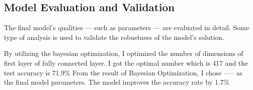 \subsection{Model Evaluation and Validation}
The final model’s qualities — such as parameters — are evaluated in detail. Some type of analysis is used to validate the robustness of the model’s solution.

By utilizing the bayesian optimization, I optimized the number of dimensions of first layer of fully connected layer. I got the optimal number which is 417 and the test accuracy is 71.9\%
From the result of Bayesian Optimization, I chose ----- as the final model parameters.
The model improves the accuracy rate by 1.7\%

